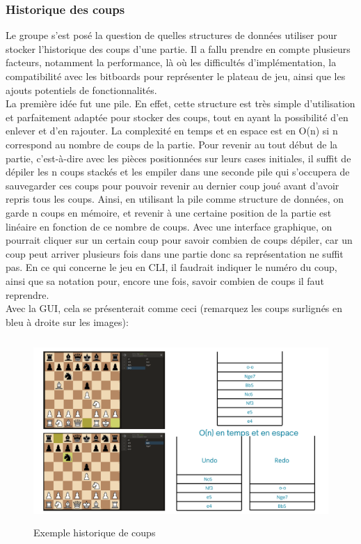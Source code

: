 \documentclass{article}
\begin{document}
\subsubsection{Historique des coups}
\par Le groupe s'est posé la question de quelles structures de données utiliser pour stocker l'historique des coups d'une
partie. Il a fallu prendre en compte plusieurs facteurs, notamment la performance, là où les difficultés d'implémentation,
la compatibilité avec les bitboards pour représenter le plateau de jeu, ainsi que les ajouts potentiels de fonctionnalités.
\\La première idée fut une pile. En effet, cette structure est très simple d'utilisation et parfaitement adaptée pour stocker
des coups, tout en ayant la possibilité d'en enlever et d'en rajouter. La complexité en temps et en espace est en O(n) si n 
correspond au nombre de coups de la partie. Pour revenir au tout début de la partie, c'est-à-dire avec les pièces positionnées
sur leurs cases initiales, il suffit de dépiler les n coups stackés et les empiler dans une seconde pile qui s'occupera de sauvegarder
ces coups pour pouvoir revenir au dernier coup joué avant d'avoir repris tous les coups. Ainsi, en utilisant la pile comme structure 
de données, on garde n coups en mémoire, et revenir à une certaine position de la partie est linéaire en fonction de ce nombre de coups.
Avec une interface graphique, on pourrait cliquer sur un certain coup pour savoir combien de coups dépiler, car un coup peut arriver
plusieurs fois dans une partie donc sa représentation ne suffit pas. En ce qui concerne le jeu en CLI, il faudrait indiquer le numéro
du coup, ainsi que sa notation pour, encore une fois, savoir combien de coups il faut reprendre.\\
Avec la GUI, cela se présenterait comme ceci (remarquez les coups surlignés en bleu à droite sur les images):

\newpage
\begin{figure}[h]
    \caption{Exemple historique de coups}
    \centering
    \includegraphics[width=\textwidth,height=7.0cm,keepaspectratio]{pile-historique-coups}
\end{figure}
\end{document}
